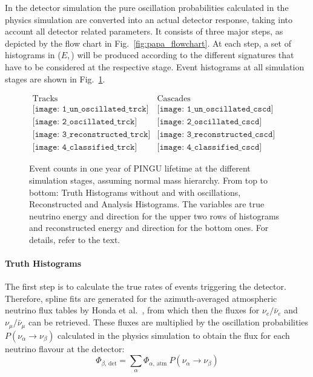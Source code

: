 In the detector simulation the pure oscillation probabilities calculated in the
physics simulation are converted into an actual detector response, taking into
account all detector related parameters. It consists of three major steps, as
depicted by the flow chart in Fig.~\ref{fig:papa_flowchart}. At each step, a set
of histograms in ($E$,\,\coszen) will be produced according to the
different signatures that have to be considered at the respective stage. Event
histograms at all simulation stages are shown in Fig.~\ref{fig:SimSteps}.

\begin{figure}
 \centering
 $\begin{array}{cc}
   \mathrm{Tracks} &
   \mathrm{Cascades}\\
   \texttt{[image: 1\_un\_oscillated\_trck]} &
   \texttt{[image: 1\_un\_oscillated\_cscd]}\\
   \texttt{[image: 2\_oscillated\_trck]} &
   \texttt{[image: 2\_oscillated\_cscd]}\\
   \texttt{[image: 3\_reconstructed\_trck]} &
   \texttt{[image: 3\_reconstructed\_cscd]}\\
   \texttt{[image: 4\_classified\_trck]} &
   \texttt{[image: 4\_classified\_cscd]}
  \end{array}$
 \caption{Event counts in one year of PINGU lifetime at the different
  simulation stages, assuming normal mass hierarchy. From top to bottom: 
  Truth Histograms without and with oscillations, Reconstructed and Analysis 
  Histograms. The variables are true neutrino energy and direction for the
  upper two rows of histograms and reconstructed energy and direction for the
  bottom ones. For details, refer to the text.}
 \label{fig:SimSteps}
\end{figure}

\paragraph{Truth Histograms}

The first step is to calculate the true rates of events triggering the
detector. Therefore, spline fits are generated for the azimuth-averaged
atmospheric neutrino flux tables by Honda et al.\ \cite{Honda,
HondaSP}, from which then the fluxes for $\nu_e/\bar\nu_e$ and
$\nu_\mu/\bar\nu_\mu$ can be retrieved. These fluxes are multiplied by the
oscillation probabilities $P(\nu_\alpha \to \nu_\beta)$ calculated in the
physics simulation to obtain the flux for each neutrino flavour at the
detector:
\begin{equation}
 \Phi_{\beta,\,\mathrm{det}} =
   \sum_\alpha \Phi_{\alpha,\,\mathrm{atm}}\ P(\nu_\alpha\to\nu_\beta)
 \label{eqn:detetor_flux}
\end{equation}


